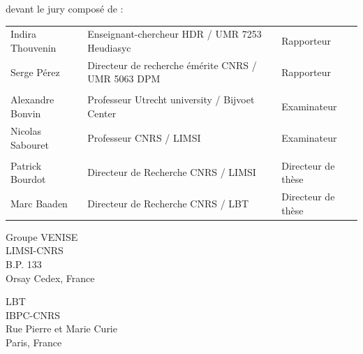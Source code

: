 \begin{titlepage}
devant le jury composé de :\\
\begin{center}
	\begin{tabular}{l l l}
	
	Indira Thouvenin 	& Enseignant-chercheur HDR / UMR 7253 Heudiasyc		& Rapporteur\\ 
	Serge Pérez		& Directeur de recherche émérite CNRS / UMR 5063 DPM		& Rapporteur\\ %
	& &\\
	Alexandre Bonvin	& Professeur Utrecht university / Bijvoet Center	 	& Examinateur\\ 
	Nicolas Sabouret	& Professeur CNRS / LIMSI				& Examinateur\\ 
	& &\\	
	Patrick Bourdot 	& Directeur de Recherche CNRS / LIMSI				& Directeur de thèse\\ 
	Marc Baaden 	& Directeur de Recherche CNRS / LBT				& Directeur de thèse\\ 
	
	\end{tabular}
\end{center}






\setlength{\columnsep}{7mm}
\setlength{\columnseprule}{0pt}

\begin{multicols}{2} 
\small 
\noindent Groupe VENISE	\\	
\noindent LIMSI-CNRS					\\
\noindent B.P. 133				\\
 Orsay Cedex, France \\	

\columnbreak

\raggedleft LBT \\
\noindent IBPC-CNRS \\
 Rue Pierre et Marie Curie  \\
 Paris, France
\end{multicols}



\end{titlepage}